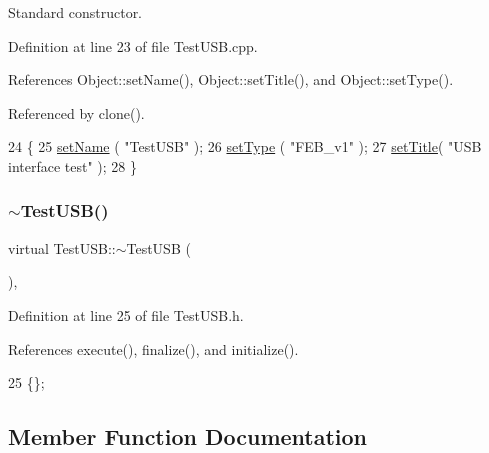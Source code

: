 Standard constructor. 



Definition at line 23 of file Test\+U\+S\+B.\+cpp.



References Object\+::set\+Name(), Object\+::set\+Title(), and Object\+::set\+Type().



Referenced by clone().


\begin{DoxyCode}
24 \{
25   \hyperlink{classObject_ae30fea75683c2d149b6b6d17c09ecd0c}{setName} ( \textcolor{stringliteral}{"TestUSB"} );
26   \hyperlink{classObject_aae534cc9d982bcb9b99fd505f2e103a5}{setType} ( \textcolor{stringliteral}{"FEB\_v1"} );
27   \hyperlink{classObject_a89557dbbad5bcaa02652f5d7fa35d20f}{setTitle}( \textcolor{stringliteral}{"USB interface test"} );  
28 \}
\end{DoxyCode}
\mbox{\label{classTestUSB_aaf3f78695bc950b0bd49c2d60494cd44}} 
\subsubsection{\texorpdfstring{$\sim$\+Test\+U\+S\+B()}{~TestUSB()}}
{\footnotesize\ttfamily virtual Test\+U\+S\+B\+::$\sim$\+Test\+U\+SB (\begin{DoxyParamCaption}{ }\end{DoxyParamCaption})\hspace{0.3cm}{\ttfamily [inline]}, {\ttfamily [virtual]}}



Definition at line 25 of file Test\+U\+S\+B.\+h.



References execute(), finalize(), and initialize().


\begin{DoxyCode}
25 \{\}; 
\end{DoxyCode}


\subsection{Member Function Documentation}
\mbox{\label{classTestUSB_a109094c177ccaaa224b514c118c93ce7}} 
